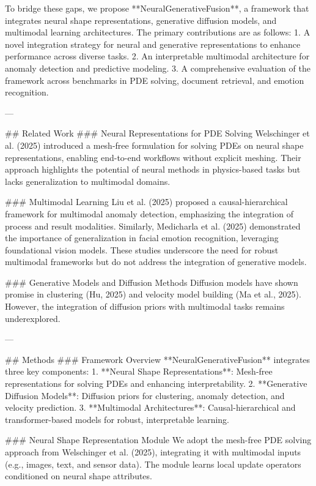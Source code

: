 To bridge these gaps, we propose **NeuralGenerativeFusion**, a framework that integrates neural shape representations, generative diffusion models, and multimodal learning architectures. The primary contributions are as follows:
1. A novel integration strategy for neural and generative representations to enhance performance across diverse tasks.
2. An interpretable multimodal architecture for anomaly detection and predictive modeling.
3. A comprehensive evaluation of the framework across benchmarks in PDE solving, document retrieval, and emotion recognition.

---

## Related Work
### Neural Representations for PDE Solving
Welschinger et al. (2025) introduced a mesh-free formulation for solving PDEs on neural shape representations, enabling end-to-end workflows without explicit meshing. Their approach highlights the potential of neural methods in physics-based tasks but lacks generalization to multimodal domains.

### Multimodal Learning
Liu et al. (2025) proposed a causal-hierarchical framework for multimodal anomaly detection, emphasizing the integration of process and result modalities. Similarly, Medicharla et al. (2025) demonstrated the importance of generalization in facial emotion recognition, leveraging foundational vision models. These studies underscore the need for robust multimodal frameworks but do not address the integration of generative models.

### Generative Models and Diffusion Methods
Diffusion models have shown promise in clustering (Hu, 2025) and velocity model building (Ma et al., 2025). However, the integration of diffusion priors with multimodal tasks remains underexplored.

---

## Methods
### Framework Overview
**NeuralGenerativeFusion** integrates three key components:
1. **Neural Shape Representations**: Mesh-free representations for solving PDEs and enhancing interpretability.
2. **Generative Diffusion Models**: Diffusion priors for clustering, anomaly detection, and velocity prediction.
3. **Multimodal Architectures**: Causal-hierarchical and transformer-based models for robust, interpretable learning.

### Neural Shape Representation Module
We adopt the mesh-free PDE solving approach from Welschinger et al. (2025), integrating it with multimodal inputs (e.g., images, text, and sensor data). The module learns local update operators conditioned on neural shape attributes.

